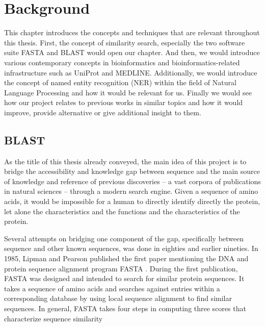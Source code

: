 
\chapter{Background} %

\label{Chapter2} %


This chapter introduces the concepts and techniques that are relevant throughout this thesis. First, the concept of similarity search, especially the two software suite FASTA and BLAST would open our chapter. And then, we would introduce various contemporary concepts in bioinformatics and bioinformatics-related infrastructure such as UniProt and MEDLINE. Additionally, we would introduce the concept of named entity recognition (NER) within the field of Natural Language Processing and how it would be relevant for us. Finally we would see how our project relates to previous works in similar topics and how it would improve, provide alternative or give additional insight to them.


\section{BLAST}

As the title of this thesis already conveyed, the main idea of this project is to bridge the accessibility and knowledge gap between sequence and the main source of knowledge and reference of previous discoveries -- a vast corpora of publications in natural sciences -- through a modern search engine. Given a sequence of amino acids, it would be impossible for a human to directly identify directly the protein, let alone the characteristics and the functions and the characteristics of the protein.

Several attempts on bridging one component of the gap, specifically between sequence and other known sequences, was done in eighties and earlier nineties. In 1985, Lipman and Pearson published the first paper mentioning the DNA and protein sequence alignment program FASTA \citep{Lipman85}. During the first publication, FASTA was designed and intended to search for similar protein sequences. It takes a sequence of amino acids and searches against entries within a corresponding database by using local sequence alignment to find similar sequences. In general, FASTA takes four steps in computing three scores that characterize sequence similarity \citep{Pearson19905}

